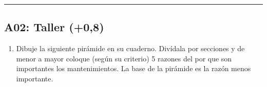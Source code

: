 \documentclass[letterpaper,10pt,spanish]{sphinxmanual}
\begin{document}
\bigskip\hrule\bigskip



\subsection{A02: Taller (+0,8)}
\label{\detokenize{1_guias/10informatica/G1004:a02-taller-0-8}}
\sphinxAtStartPar
{}
\begin{enumerate}
%
\item {} 
\sphinxAtStartPar
Dibuje la siguiente pirámide en su cuaderno. Divídala por secciones y de menor a mayor coloque (según su criterio) 5 razones del por que son importantes los mantenimientos. La base de la pirámide es la razón menos importante.

\end{enumerate}
\end{document}
